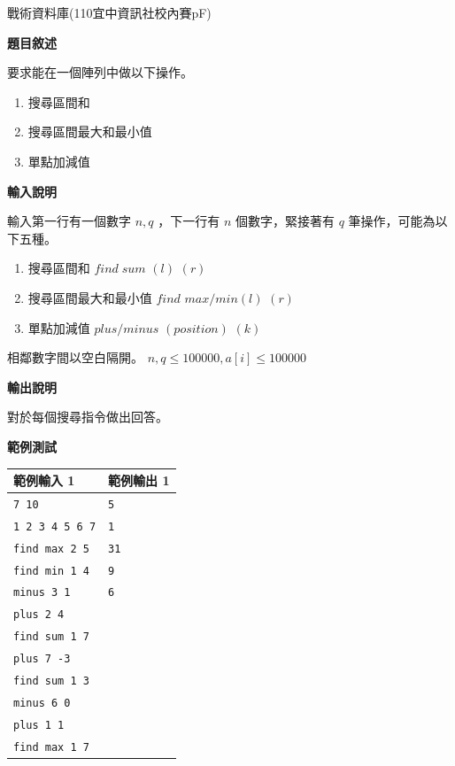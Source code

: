     \problem 戰術資料庫(110宜中資訊社校內賽pF)

    \textbf{題目敘述}

    要求能在一個陣列中做以下操作。

    \begin{enumerate}
        \item 搜尋區間和
        \item 搜尋區間最大和最小值
        \item 單點加減值
    \end{enumerate}

    \textbf{輸入說明}

    輸入第一行有一個數字 $n, q$ ，下一行有 $n$ 個數字，緊接著有 $q$ 筆操作，可能為以下五種。

    \begin{enumerate}
        \item 搜尋區間和 $find \; sum$ $(l)$ $(r)$
        \item 搜尋區間最大和最小值 $find$ $max/min (l)$ $(r)$
        \item 單點加減值 $plus/minus$ $(position)$ $(k)$
    \end{enumerate}

    相鄰數字間以空白隔開。
    $n, q \leq 100000 , a[i] \leq 100000$


    \textbf{輸出說明}

    對於每個搜尋指令做出回答。

    \textbf{範例測試}

    \begin{tabular}{|m{7cm}|m{7cm}|}
        \hline
        範例輸入 1 & 範例輸出 1 \\
        \hline
        \verb|7 10|          & \verb|5| \\
        \verb|1 2 3 4 5 6 7| & \verb|1| \\
        \verb|find max 2 5|  & \verb|31| \\
        \verb|find min 1 4|  & \verb|9| \\
        \verb|minus 3 1|     & \verb|6| \\
        \verb|plus 2 4|      & \\
        \verb|find sum 1 7| & \\
        \verb|plus 7 -3| & \\
        \verb|find sum 1 3| & \\
        \verb|minus 6 0| & \\
        \verb|plus 1 1| & \\
        \verb|find max 1 7| & \\
        \hline
    \end{tabular}